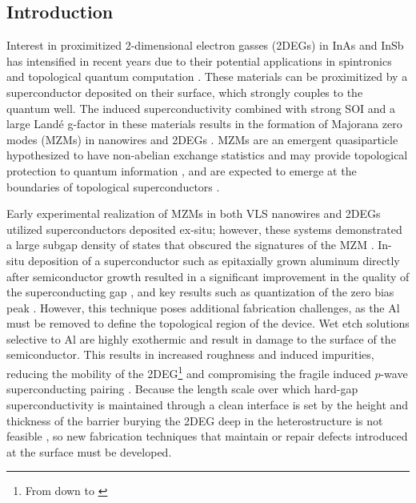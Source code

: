 \subsection{\label{sec:surf_intro}Introduction}

Interest in proximitized 2-dimensional electron gasses (2DEGs) in InAs and InSb has intensified in recent years due to their potential applications in spintronics \cite{spintronics} and topological quantum computation \cite{PhysRevLett.105.077001,s41578-018-0003-1}. These materials can be proximitized by a superconductor deposited on their surface, which strongly couples to the quantum well. The induced superconductivity combined with strong SOI and a large Land\'e g-factor in these materials results in the formation of Majorana zero modes (MZMs) in nanowires \cite{Mourik1003,AlbrechtNature} and 2DEGs \cite{PhysRevLett.119.136803,PhysRevLett.119.176805}. MZMs are an emergent quasiparticle hypothesized to have non-abelian exchange statistics and may provide topological protection to quantum information \cite{RevModPhys.80.1083}, and are expected to emerge at the boundaries of topological superconductors \cite{RevModPhys.83.1057,Kitaev_2001,doi:10.1146/030212-184337}.

Early experimental realization of MZMs in both VLS nanowires and 2DEGs utilized superconductors deposited ex-situ; however, these systems demonstrated a large subgap density of states that obscured the signatures of the MZM \cite{PhysRevB.88.064506,PhysRevLett.110.186803}. In-situ deposition of a superconductor such as epitaxially grown aluminum directly after semiconductor growth resulted in a significant improvement in the quality of the superconducting gap \cite{nnano.2014.306,hard_gap_2deg}, and key results such as quantization of the zero bias peak \cite{nature26142}. However, this technique poses additional fabrication challenges, as the Al must be removed to define the topological region of the device. Wet etch solutions selective to Al are highly exothermic and result in damage to the surface of the semiconductor. This results in increased roughness and induced impurities, reducing the mobility of the 2DEG\footnote{From  \cite{shabani_transport} down to  \cite{hard_gap_2deg,PhysRevLett.115.127001}} and compromising the fragile induced $p$-wave superconducting pairing \cite{PhysRevB.83.184520,PhysRevB.85.140513}. Because the length scale over which hard-gap superconductivity is maintained through a clean interface is set by the height and thickness of the barrier \cite{PhysRevLett.110.186803} burying the 2DEG deep in the heterostructure is not feasible \cite{PhysRevB.93.155402}, so new fabrication techniques that maintain or repair defects introduced at the surface must be developed.


